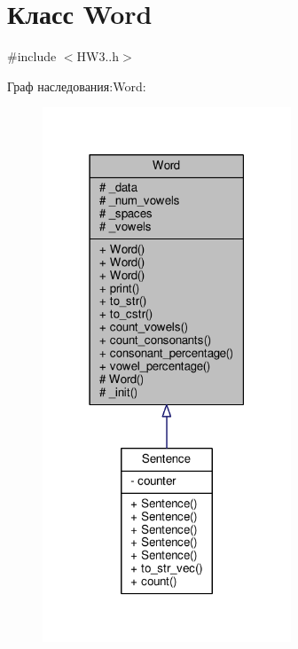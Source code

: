 \hypertarget{classWord}{}\section{Класс Word}
\label{classWord}


{\ttfamily \#include $<$H\+W3..\+h$>$}



Граф наследования\+:Word\+:\nopagebreak
\begin{figure}[H]
\begin{center}
\leavevmode
\includegraphics[width=210pt]{classWord__inherit__graph}
\end{center}
\end{figure}


